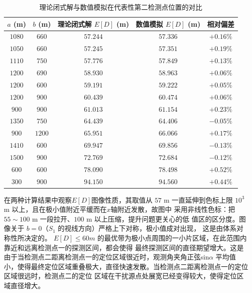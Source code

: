 \begin{table}[!htbp]
    \caption{理论闭式解与数值模拟在代表性第二检测点位置的对比}\label{tab:p2-cross}
    \centering
    \begin{tabular}{ccccc}
        \toprule
        $a$ (m) & $b$ (m) & 理论闭式解 $E[D]$ (m) & 数值模拟 $E[D]$ (m) & 相对偏差 \\
        \midrule
        $1080$ & $660$  & $57.244$ & $57.336$ & $+0.16\%$ \\
        $1050$ & $660$  & $57.245$ & $57.351$ & $+0.19\%$ \\
        $1110$ & $750$  & $57.776$ & $57.849$ & $+0.13\%$ \\
        $1200$ & $690$  & $58.930$ & $58.963$ & $+0.06\%$ \\
        $1200$ & $600$  & $59.191$ & $59.222$ & $+0.05\%$ \\
        \midrule
        $1200$ & $900$  & $60.439$ & $60.474$ & $+0.06\%$ \\
        $900$  & $900$  & $61.013$ & $61.154$ & $+0.23\%$ \\
        $1350$ & $750$  & $64.439$ & $64.406$ & $-0.05\%$ \\
        $900$  & $1200$ & $65.951$ & $66.066$ & $+0.17\%$ \\
        $1410$ & $600$  & $69.947$ & $69.856$ & $-0.13\%$ \\
        \midrule
        $1500$ & $900$  & $72.769$ & $72.684$ & $-0.12\%$ \\
        $600$  & $600$  & $78.090$ & $78.498$ & $+0.52\%$ \\
        $300$  & $900$  & $94.150$ & $94.560$ & $+0.44\%$ \\
        \bottomrule
    \end{tabular}
\end{table}


在两种计算结果中观察$E[D]$图像性质，其取值从
$57$ m 一直延伸到色标上限 $10^3$ m 以上，且在极小值附近平缓而在$x$轴附近发散，故图中
采用非线性色标：把 $55\sim100$ m 一段拉开、$100$ m 以上压缩，提升问题更关心的低
值区的区分度。图像关于 $b=0$（$S_1$ 的视线方向）严格上下对称，极小值成对出现，
这是由体系对称性所决定的。
$E[D]\le60m$  的最优带为极小点周围的一小片区域，在此范围内靠近和远离检测点一的探测区间，都会使得
最终探测区间的直径期望增大。这是由于当检测点二距离检测点一的定位区域很近时，观测角夹角正弦sin$\alpha$
平均值小，使得最终定位区域重叠极大，直径快速发散。当检测点二距离检测点一的定位区域很远时，检测点二的定位
区域在干扰源点处展宽已经变得较大，使得定位区域直径增大。


